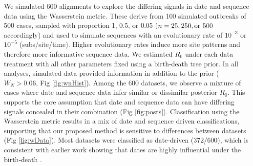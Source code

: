 \documentclass{article}
\begin{document}
We simulated 600 alignments to explore the differing signals in date and sequence data using the Wasserstein metric. These derive from 100 simulated outbreaks of 500 cases, sampled with proportion 1, 0.5, or 0.05 ($n = 25, 250, \textnormal{or } 500$ accordingly) and used to simulate sequences with an evolutionary rate of $10^{-3}$ or $10^{-5}$ (subs/site/time). Higher evolutionary rates induce more site patterns and therefore more informative sequence data. We estimated $R_0$ under each data treatment with all other parameters fixed using a birth-death tree prior. In all analyses, simulated data provided information in addition to the prior ($W_{N}>0.06$, Fig \ref{fig:wnHist}). Among the 600 datasets, we  observe a mixture of cases where date and sequence data infer similar or dissimilar posterior $R_{0}$. This supports the core assumption that date and sequence data can have differing signals concealed in their combination (Fig \ref{fig:posts}). Classification using the Wasserstein metric results in a mix of date and sequence driven classifications, supporting that our proposed method is sensitive to differences between datasets (Fig \ref{fig:wData}). Most datasets were classified as date-driven (372/600), which is consistent with earlier work showing that dates are highly influential under the birth-death \citep{volz_sampling_2014}.
\end{document}
